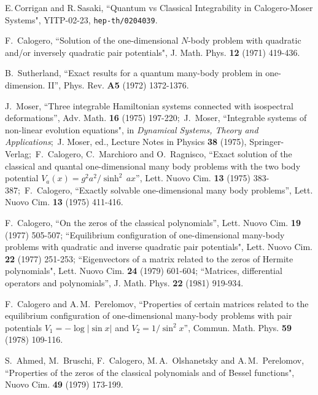 \documentclass[a4paper,12pt]{article}
\begin{document}
\begin{thebibliography}{99}

E.\,Corrigan and R.\,Sasaki,
``Quantum vs Classical  Integrability in Calogero-Moser Systems",
YITP-02-23, {\tt hep-th/0204039}.

F.~Calogero,
``Solution of the one-dimensional \(N\)-body problem with quadratic
and/or inversely quadratic pair potentials",
J. Math. Phys. {\bf 12} (1971) 419-436.

B.~Sutherland,
``Exact results for a quantum many-body problem in one-dimension. II'',
Phys. Rev. {\bf A5} (1972) 1372-1376.

J.~Moser,
``Three integrable Hamiltonian systems connected with isospectral
deformations'',
Adv. Math. {\bf 16} (1975) 197-220;\
J.~Moser,
``Integrable systems of non-linear evolution equations",
in {\it Dynamical Systems, Theory and Applications\/};\
J. Moser, ed., Lecture Notes in Physics {\bf 38} (1975), Springer-Verlag;\
F.~Calogero, C.~Marchioro and O.~Ragnisco,
``Exact solution of the classical and quantal one-dimensional many body
problems with the two body potential \(V_{a}(x)=g^2a^2/\sinh^2\,ax\)'',
Lett. Nuovo Cim. {\bf 13} (1975) 383-387;\
F.~Calogero,
``Exactly solvable one-dimensional many body problems'',
Lett. Nuovo Cim. {\bf 13} (1975) 411-416.

F.~Calogero,
``On the zeros of the classical polynomials'',
Lett. Nuovo Cim. {\bf 19} (1977) 505-507;
``Equilibrium configuration of one-dimensional many-body problems
with quadratic and inverse quadratic pair potentials",
Lett. Nuovo Cim. {\bf 22} (1977) 251-253;
``Eigenvectors of a matrix related to the zeros of Hermite polynomials",
Lett. Nuovo Cim. {\bf 24} (1979) 601-604;
``Matrices, differential operators and polynomials'',
J. Math. Phys. {\bf 22} (1981) 919-934.

\bibitem{calpere}
F.~Calogero and A.\,M.~Perelomov,
``Properties of certain matrices related to the equilibrium
configuration of one-dimensional many-body problems with pair
potentials $V_{1}=-\log|\sin x|$ and $V_{2}=1/\sin^2x$'',
Commun. Math. Phys. {\bf 59} (1978) 109-116.

\bibitem{ahmcal}
S.~Ahmed, M.~Bruschi, F.~Calogero, M.\,A.~Olshanetsky and A.\,M.~Perelomov,
``Properties of the zeros of the classical polynomials and of Bessel
functions",
Nuovo Cim. {\bf 49} (1979) 173-199.


\end{thebibliography}
\end{document}
